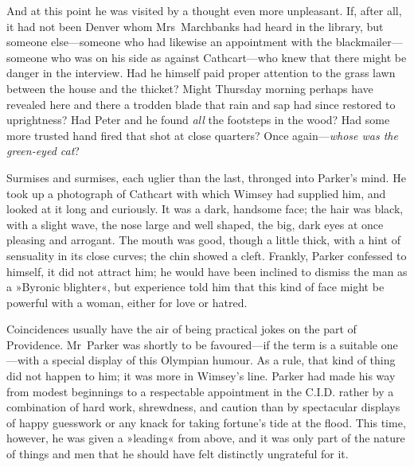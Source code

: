And at this point he was visited by a thought even more unpleasant. If, after all, it had not been Denver whom Mrs~Marchbanks had heard in the library, but someone else—someone who had likewise an appointment with the blackmailer—someone who was on his side as against Cathcart—who knew that there might be danger in the interview. Had he himself paid proper attention to the grass lawn between the house and the thicket?  Might Thursday morning perhaps have revealed here and there a trodden blade that rain and sap had since restored to uprightness? Had Peter and he found \textit{all} the footsteps in the wood? Had some more trusted hand fired that shot at close quarters? Once again—\textit{whose was the green-eyed cat}?

Surmises and surmises, each uglier than the last, thronged into Parker's mind. He took up a photograph of Cathcart with which Wimsey had supplied him, and looked at it long and curiously. It was a dark, handsome face; the hair was black, with a slight wave, the nose large and well shaped, the big, dark eyes at once pleasing and arrogant. The mouth was good, though a little thick, with a hint of sensuality in its close curves; the chin showed a cleft. Frankly, Parker confessed to himself, it did not attract him; he would have been inclined to dismiss the man as a »Byronic blighter«, but experience told him that this kind of face might be powerful with a woman, either for love or hatred.

Coincidences usually have the air of being practical jokes on the part of Providence. Mr~Parker was shortly to be favoured—if the term is a suitable one—with a special display of this Olympian humour. As a rule, that kind of thing did not happen to him; it was more in Wimsey's line. Parker had made his way from modest beginnings to a respectable appointment in the C\@.I\@.D\@. rather by a combination of hard work, shrewdness, and caution than by spectacular displays of happy guesswork or any knack for taking fortune's tide at the flood. This time, however, he was given a »leading« from above, and it was only part of the nature of things and men that he should have felt distinctly ungrateful for it.

